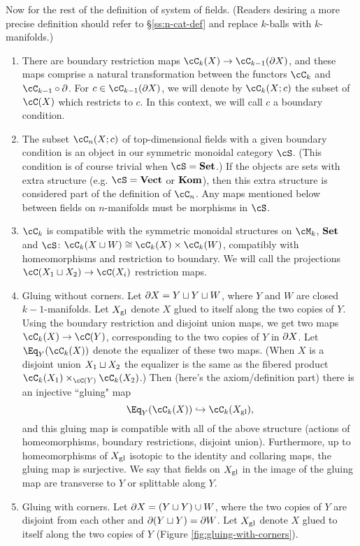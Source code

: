 Now for the rest of the definition of system of fields.
(Readers desiring a more precise definition should refer to \S\ref{ss:n-cat-def}
and replace $k$-balls with $k$-manifolds.)
\begin{enumerate}
\item There are boundary restriction maps $\cC_k(X) \to \cC_{k-1}(\bd X)$, 
and these maps comprise a natural
transformation between the functors $\cC_k$ and $\cC_{k-1}\circ\bd$.
For $c \in \cC_{k-1}(\bd X)$, we will denote by $\cC_k(X; c)$ the subset of 
$\cC(X)$ which restricts to $c$.
In this context, we will call $c$ a boundary condition.
\item The subset $\cC_n(X;c)$ of top-dimensional fields 
with a given boundary condition is an object in our symmetric monoidal category $\cS$.
(This condition is of course trivial when $\cS = \Set$.) 
If the objects are sets with extra structure (e.g. $\cS = \Vect$ or $\Kom$), 
then this extra structure is considered part of the definition of $\cC_n$.
Any maps mentioned below between fields on $n$-manifolds must be morphisms in $\cS$.
\item $\cC_k$ is compatible with the symmetric monoidal
structures on $\cM_k$, $\Set$ and $\cS$: $\cC_k(X \du W) \cong \cC_k(X)\times \cC_k(W)$,
compatibly with homeomorphisms and restriction to boundary.
We will call the projections $\cC(X_1 \du X_2) \to \cC(X_i)$
restriction maps.
\item Gluing without corners.
Let $\bd X = Y \du Y \du W$, where $Y$ and $W$ are closed $k{-}1$-manifolds.
Let $X\sgl$ denote $X$ glued to itself along the two copies of $Y$.
Using the boundary restriction and disjoint union
maps, we get two maps $\cC_k(X) \to \cC(Y)$, corresponding to the two
copies of $Y$ in $\bd X$.
Let $\Eq_Y(\cC_k(X))$ denote the equalizer of these two maps.
(When $X$ is a disjoint union $X_1\du X_2$ the equalizer is the same as the fibered product
$\cC_k(X_1)\times_{\cC(Y)} \cC_k(X_2)$.)
Then (here's the axiom/definition part) there is an injective ``gluing" map
\[
	\Eq_Y(\cC_k(X)) \hookrightarrow \cC_k(X\sgl) ,
\]
and this gluing map is compatible with all of the above structure (actions
of homeomorphisms, boundary restrictions, disjoint union).
Furthermore, up to homeomorphisms of $X\sgl$ isotopic to the identity 
and collaring maps,
the gluing map is surjective.
We say that fields on $X\sgl$ in the image of the gluing map
are transverse to $Y$ or splittable along $Y$.
\item Gluing with corners.
Let $\bd X = (Y \du Y) \cup W$, where the two copies of $Y$ 
are disjoint from each other and $\bd(Y\du Y) = \bd W$.
Let $X\sgl$ denote $X$ glued to itself along the two copies of $Y$
(Figure \ref{fig:gluing-with-corners}).
\begin{figure}[t]
\begin{center}
\begin{tikzpicture}


\end{tikzpicture}
\end{center}
\end{figure}
\end{enumerate}
